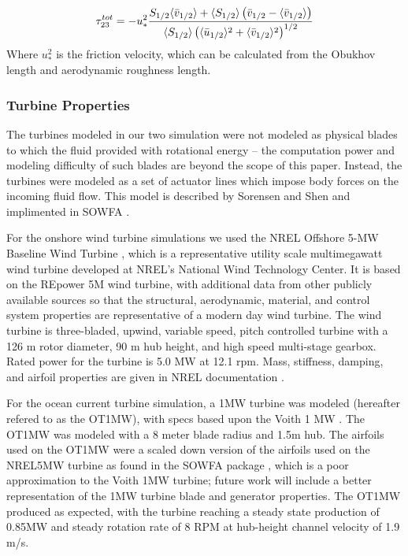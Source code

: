 \begin{equation}
   \label{tau23}
   \tau^{tot}_{23}=
   -u^2_*\frac{S_{1/2}\langle \bar{v}_{1/2}\rangle+\langle S_{1/2}\rangle\left( \bar{v}_{1/2}-\langle\bar{v}_{1/2}\rangle\right) }
   {\langle S_{1/2}\rangle\left( \langle\bar{u}_{1/2}\rangle^2+\langle \bar{v}_{1/2}\rangle^2\right)^{1/2} }
\end{equation}
Where $u^2_*$ is the friction velocity, which can be calculated from the Obukhov length and aerodynamic roughness length.

\subsubsection{Turbine Properties}

The turbines modeled in our two simulation were not modeled as physical blades to which the fluid provided with rotational energy -- the computation power and modeling difficulty of such blades are beyond the scope of this paper. Instead, the turbines were modeled as a set of actuator lines which impose body forces on the incoming fluid flow. This model is described by Sorensen and Shen \cite{sorensen:393} and implimented in SOWFA \cite{SOWFA}.

For the onshore wind turbine simulations we used the NREL Offshore 5-MW Baseline Wind Turbine \cite{jonkman_definition_2009}, which is a representative utility scale multimegawatt wind turbine developed at NREL's National Wind Technology Center.  It is based on the REpower 5M wind turbine, with additional data from other publicly available sources so that the structural, aerodynamic, material, and control system properties are representative of a modern day wind turbine.  The wind turbine is three-bladed, upwind, variable speed, pitch controlled turbine with a 126 m rotor diameter, 90 m hub height, and high speed multi-stage gearbox.  Rated power for the turbine is 5.0 MW at 12.1 rpm.  Mass, stiffness, damping, and airfoil properties are given in NREL documentation \cite{jonkman_definition_2009}.

For the ocean current turbine simulation, a 1MW turbine was modeled (hereafter refered to as the OT1MW), with specs based upon the Voith 1 MW \cite{Voith}. The OT1MW was modeled with a 8 meter blade radius and 1.5m hub. The airfoils used on the OT1MW were a scaled down version of the airfoils used on the NREL5MW turbine as found in the SOWFA package \cite{SOWFA}, which is a poor approximation to the Voith 1MW turbine; future work will include a better representation of the 1MW turbine blade and generator properties. The OT1MW produced as expected, with the turbine reaching a steady state production of 0.85MW and steady rotation rate of 8 RPM at hub-height channel velocity of 1.9 m/s.




